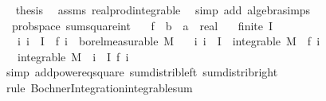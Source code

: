 \begin{isabellebody}
\ \isamarkupfalse%
\ {\isacharquery}{\kern0pt}thesis\ \isamarkupfalse%
\ assms\ real{\isacharunderscore}{\kern0pt}prod{\isacharunderscore}{\kern0pt}integrable\ \isamarkupfalse%
\ {\isacharparenleft}{\kern0pt}simp\ add{\isacharcolon}{\kern0pt}\ algebra{\isacharunderscore}{\kern0pt}simps{\isacharparenright}{\kern0pt}\isanewline
{}\isamarkupfalse%
%
\endisatagproof
{\isafoldproof}%
%
\isadelimproof
\isanewline
%
\endisadelimproof
\isanewline
{}\isamarkupfalse%
\ {\isacharparenleft}{\kern0pt}\ prob{\isacharunderscore}{\kern0pt}space{\isacharparenright}{\kern0pt}\ sum{\isacharunderscore}{\kern0pt}square{\isacharunderscore}{\kern0pt}int{\isacharcolon}{\kern0pt}\isanewline
\ \ \ f\ {\isacharcolon}{\kern0pt}{\isacharcolon}{\kern0pt}\ {\isachardoublequoteopen}{\isacharprime}{\kern0pt}b\ {\isasymRightarrow}\ {\isacharprime}{\kern0pt}a\ {\isasymRightarrow}\ real{\isachardoublequoteclose}\isanewline
\ \ \ {\isachardoublequoteopen}finite\ I{\isachardoublequoteclose}\isanewline
\ \ \ {\isachardoublequoteopen}{\isasymAnd}i{\isachardot}{\kern0pt}\ i\ {\isasymin}\ I\ {\isasymLongrightarrow}\ f\ i\ {\isasymin}\ borel{\isacharunderscore}{\kern0pt}measurable\ M{\isachardoublequoteclose}\isanewline
\ \ \ {\isachardoublequoteopen}{\isasymAnd}i{\isachardot}{\kern0pt}\ i\ {\isasymin}\ I\ {\isasymLongrightarrow}\ integrable\ M\ {\isacharparenleft}{\kern0pt}{\isasymlambda}{\isasymomega}{\isachardot}{\kern0pt}\ f\ i\ {\isasymomega}{\isacharcircum}{\kern0pt}{}{\isacharparenright}{\kern0pt}{\isachardoublequoteclose}\isanewline
\ \ \ {\isachardoublequoteopen}integrable\ M\ {\isacharparenleft}{\kern0pt}{\isasymlambda}{\isasymomega}{\isachardot}{\kern0pt}\ {\isacharparenleft}{\kern0pt}{\isasymSum}i\ {\isasymin}\ I{\isachardot}{\kern0pt}\ f\ i\ {\isasymomega}{\isacharparenright}{\kern0pt}\isanewline
%
\isadelimproof
\ \ %
\endisadelimproof
%
\isatagproof
{}\isamarkupfalse%
\ {\isacharparenleft}{\kern0pt}simp\ add{\isacharcolon}{\kern0pt}power{}{\isacharunderscore}{\kern0pt}eq{\isacharunderscore}{\kern0pt}square\ sum{\isacharunderscore}{\kern0pt}distrib{\isacharunderscore}{\kern0pt}left\ sum{\isacharunderscore}{\kern0pt}distrib{\isacharunderscore}{\kern0pt}right{\isacharparenright}{\kern0pt}\isanewline
\ \ \isamarkupfalse%
\ {\isacharparenleft}{\kern0pt}rule\ Bochner{\isacharunderscore}{\kern0pt}Integration{\isachardot}{\kern0pt}integrable{\isacharunderscore}{\kern0pt}sum{\isacharparenright}{\kern0pt}\isanewline

\end{isabellebody}
